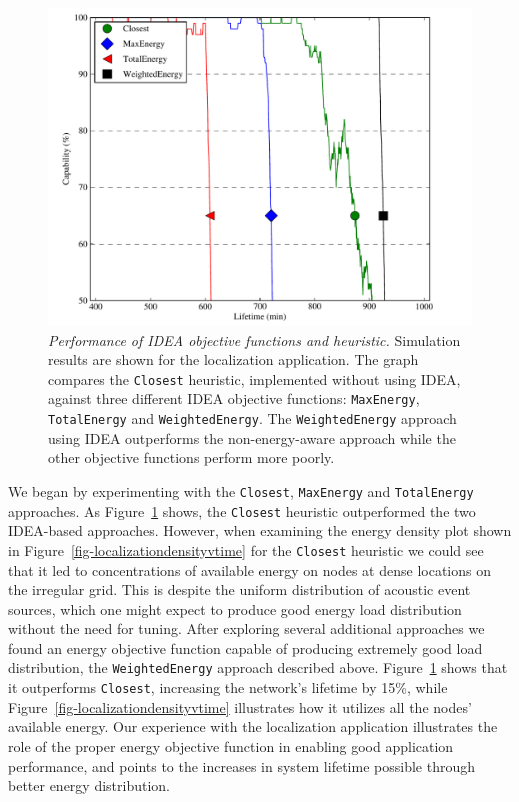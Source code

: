 \begin{figure}[t]
\begin{center}
\includegraphics[width=\hsize]{./figs/graph_capability_vs_time1210_2100.pdf}
\end{center}

\caption{\textit{Performance of IDEA objective functions and heuristic.}
Simulation results are shown for the localization application. The graph
compares the \texttt{Closest} heuristic, implemented without using IDEA,
against three different IDEA objective functions: \texttt{MaxEnergy},
\texttt{TotalEnergy} and \texttt{WeightedEnergy}. The \texttt{WeightedEnergy}
approach using IDEA outperforms the non-energy-aware approach while the other
objective functions perform more poorly.}

\label{fig-ideavsheuristics}
\end{figure}

\vfill\eject

We began by experimenting with the \texttt{Closest}, \texttt{MaxEnergy} and
\texttt{TotalEnergy} approaches. As Figure~\ref{fig-ideavsheuristics} shows,
the \texttt{Closest} heuristic outperformed the two IDEA-based approaches.
However, when examining the energy density plot shown in
Figure~\ref{fig-localizationdensityvtime} for the \texttt{Closest} heuristic
we could see that it led to concentrations of available energy on nodes at
dense locations on the irregular grid. This is despite the uniform
distribution of acoustic event sources, which one might expect to produce
good energy load distribution without the need for tuning. After exploring
several additional approaches we found an energy objective function capable
of producing extremely good load distribution, the \texttt{WeightedEnergy}
approach described above. Figure~\ref{fig-ideavsheuristics} shows that it
outperforms \texttt{Closest}, increasing the network's lifetime by 15\%,
while Figure~\ref{fig-localizationdensityvtime} illustrates how it utilizes
all the nodes' available energy. Our experience with the localization
application illustrates the role of the proper energy objective function in
enabling good application performance, and points to the increases in system
lifetime possible through better energy distribution. 
